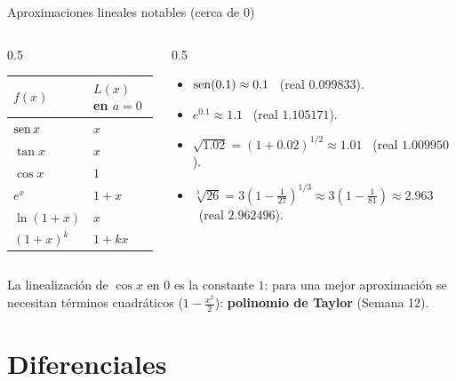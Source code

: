\documentclass[10pt,aspectratio=169]{beamer}
\begin{document}
\begin{frame}{Aproximaciones lineales notables (cerca de $0$)}
  \begin{columns}
    \begin{column}{0.5\textwidth}
      \renewcommand{\arraystretch}{1.5}
      \begin{tabular}{l|l}
        $f(x)$ & $L(x)$ en $a=0$\\ \hline
        $\operatorname{sen} x$ & $x$\\
        $\tan x$ & $x$\\
        $\cos x$ & $1$\\
        $e^x$ & $1+x$\\
        $\ln(1+x)$ & $x$\\
        $(1+x)^k$ & $1+kx$
      \end{tabular}
    \end{column}
    \begin{column}{0.5\textwidth}
      \begin{ejemplo}[2]
        \begin{itemize}
          \item $\operatorname{sen}(0.1)\approx0.1$ \ (real $0.099833$).
          \item $e^{0.1}\approx1.1$ \ (real $1.105171$).
          \item $\sqrt{1.02}=(1+0.02)^{1/2}\approx1.01$ \ (real $1.009950$).
          \item $\sqrt[3]{26}=3\left(1-\frac1{27}\right)^{1/3}\approx3\left(1-\frac1{81}\right)\approx2.963$ \ (real $2.962496$).
        \end{itemize}
      \end{ejemplo}
    \end{column}
  \end{columns}
  \begin{observacion}
    La linealización de $\cos x$ en $0$ es la constante $1$: para una mejor aproximación se necesitan términos cuadráticos
    ($1-\frac{x^2}{2}$): \textbf{polinomio de Taylor} (Semana 12).
  \end{observacion}
\end{frame}

\section{Diferenciales}
\end{document}

